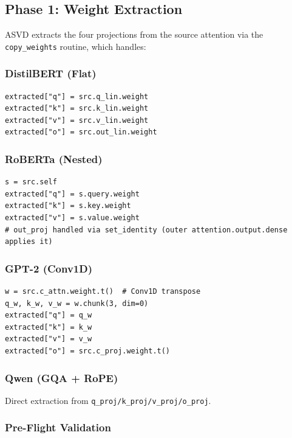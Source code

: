 \subsection{Phase 1: Weight Extraction}

ASVD extracts the four projections from the source attention via the 
\texttt{copy\_weights} routine, which handles:

\subsubsection{DistilBERT (Flat)}

\begin{lstlisting}
extracted["q"] = src.q_lin.weight
extracted["k"] = src.k_lin.weight
extracted["v"] = src.v_lin.weight
extracted["o"] = src.out_lin.weight
\end{lstlisting}

\subsubsection{RoBERTa (Nested)}

\begin{lstlisting}
s = src.self
extracted["q"] = s.query.weight
extracted["k"] = s.key.weight
extracted["v"] = s.value.weight
# out_proj handled via set_identity (outer attention.output.dense applies it)
\end{lstlisting}

\subsubsection{GPT-2 (Conv1D)}

\begin{lstlisting}
w = src.c_attn.weight.t()  # Conv1D transpose
q_w, k_w, v_w = w.chunk(3, dim=0)
extracted["q"] = q_w
extracted["k"] = k_w
extracted["v"] = v_w
extracted["o"] = src.c_proj.weight.t()
\end{lstlisting}

\subsubsection{Qwen (GQA + RoPE)}

Direct extraction from \texttt{q\_proj/k\_proj/v\_proj/o\_proj}.

\subsubsection{Pre-Flight Validation}

